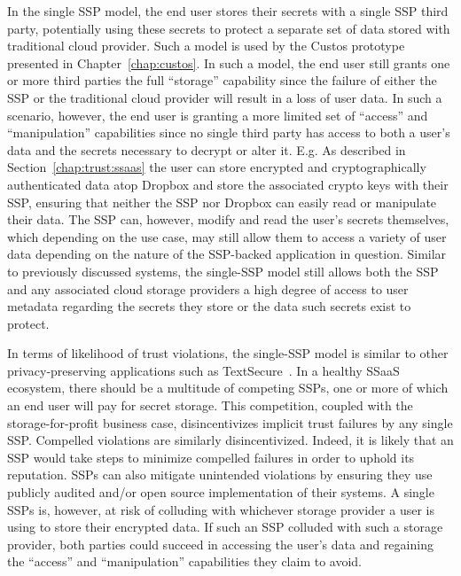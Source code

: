 In the single SSP model, the end user stores their secrets with a
single SSP third party, potentially using these secrets to protect a
separate set of data stored with traditional cloud provider. Such a
model is used by the Custos prototype presented in
Chapter~\ref{chap:custos}. In such a model, the end user still grants
one or more third parties the full ``storage'' capability since the
failure of either the SSP or the traditional cloud provider will
result in a loss of user data. In such a scenario, however, the end
user is granting a more limited set of ``access'' and ``manipulation''
capabilities since no single third party has access to both a user's
data and the secrets necessary to decrypt or alter it. E.g. As
described in Section~\ref{chap:trust:ssaas} the user can store
encrypted and cryptographically authenticated data atop Dropbox and
store the associated crypto keys with their SSP, ensuring that neither
the SSP nor Dropbox can easily read or manipulate their data. The SSP
can, however, modify and read the user's secrets themselves, which
depending on the use case, may still allow them to access a variety of
user data depending on the nature of the SSP-backed application in
question. Similar to previously discussed systems, the single-SSP
model still allows both the SSP and any associated cloud storage
providers a high degree of access to user metadata regarding the
secrets they store or the data such secrets exist to protect.

In terms of likelihood of trust violations, the single-SSP model is
similar to other privacy-preserving applications such as
TextSecure~\cite{frosch2014}. In a healthy SSaaS ecosystem, there
should be a multitude of competing SSPs, one or more of which an end
user will pay for secret storage. This competition, coupled with the
storage-for-profit business case, disincentivizes implicit trust
failures by any single SSP. Compelled violations are similarly
disincentivized. Indeed, it is likely that an SSP would take steps to
minimize compelled failures in order to uphold its reputation. SSPs
can also mitigate unintended violations by ensuring they use publicly
audited and/or open source implementation of their systems. A single
SSPs is, however, at risk of colluding with whichever storage provider
a user is using to store their encrypted data. If such an SSP colluded
with such a storage provider, both parties could succeed in accessing
the user's data and regaining the ``access'' and ``manipulation''
capabilities they claim to avoid.

